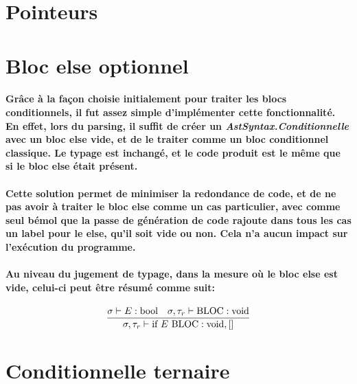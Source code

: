 \documentclass[french]{article}
\newcommand{\jugementElseOpt}{
        \dfrac{\sigma \vdash E : \text{bool} \hspace*{10pt} \sigma, \tau_r \vdash \text{BLOC} : \text{void}}
              {\sigma, \tau_r \vdash \text{if } E \text{ BLOC} : \text{void}, []}
        }
\begin{document}
\section{Pointeurs}

\section{Bloc else optionnel}
\paragraph*{Grâce à la façon choisie initialement pour traiter les blocs conditionnels, il fut assez simple d'implémenter cette fonctionnalité.
En effet, lors du parsing, il suffit de créer un \textit{AstSyntax.Conditionnelle} avec un bloc else vide, et de le traiter comme un bloc conditionnel classique.
Le typage est inchangé, et le code produit est le même que si le bloc else était présent.}
\paragraph*{Cette solution permet de minimiser la redondance de code, et de ne pas avoir à traiter le bloc else comme un cas particulier, avec comme seul bémol
que la passe de génération de code rajoute dans tous les cas un label pour le else, qu'il soit vide ou non. Cela n'a aucun impact sur l'exécution du programme.}
\paragraph*{Au niveau du jugement de typage, dans la mesure où le bloc else est vide, celui-ci peut être résumé comme suit:}
\[\jugementElseOpt\]

\section{Conditionnelle ternaire}
\end{document}
